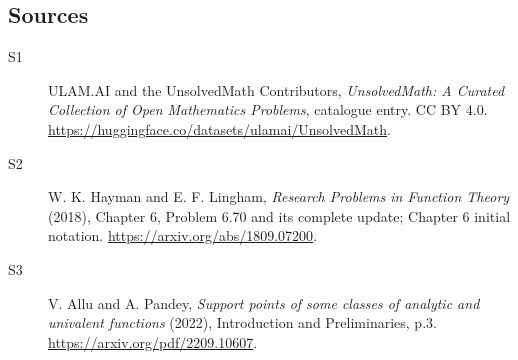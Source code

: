 \documentclass[11pt]{article}
\begin{document}
\subsection{Sources}
\begin{description}
\item[\hypertarget{source:statement:1}{S1}] ULAM.AI and the UnsolvedMath Contributors, \emph{UnsolvedMath: A Curated Collection of Open Mathematics Problems}, catalogue entry. CC BY 4.0. \url{https://huggingface.co/datasets/ulamai/UnsolvedMath}.
\item[\hypertarget{source:statement:2}{S2}] W. K. Hayman and E. F. Lingham, \emph{Research Problems in Function Theory} (2018), Chapter 6, Problem 6.70 and its complete update; Chapter 6 initial notation. \url{https://arxiv.org/abs/1809.07200}.
\item[\hypertarget{source:statement:3}{S3}] V. Allu and A. Pandey, \emph{Support points of some classes of analytic and univalent functions} (2022), Introduction and Preliminaries, p.3. \url{https://arxiv.org/pdf/2209.10607}.
\end{description}
\label{end:statement}
\end{document}
